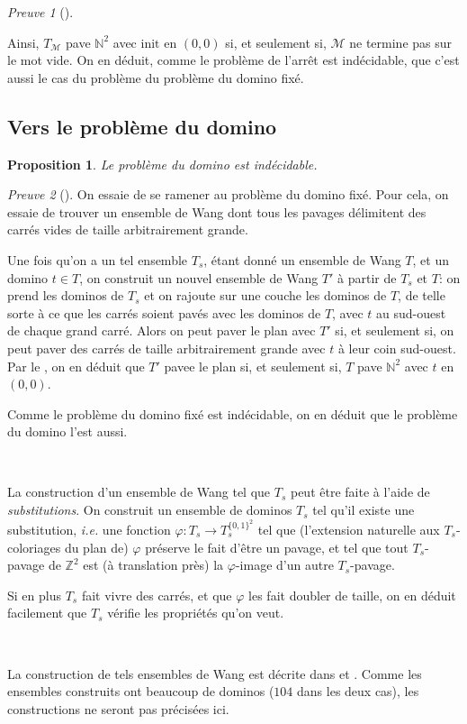 \documentclass{scrartcl}
\newcommand{\N}{\mathbb N}
\newcommand{\Z}{\mathbb Z}
\newtheorem{proposition}{Proposition}
\theoremstyle{definition}
\theoremstyle{remark}
\newtheorem*{preuve}{Preuve}
\begin{document}
\begin{preuve}[]
  \ 

  Ainsi, $T_\mathcal M$ pave $\N^2$ avec $\mathrm{init}$ en $(0,0)$ si, et seulement si, $\mathcal M$ ne termine pas sur le mot vide. On en déduit, comme le problème de l'arrêt est indécidable, que c'est aussi le cas du problème du problème du domino fixé.
\end{preuve}

\subsection{Vers le problème du domino}

\begin{proposition}
  Le problème du domino est indécidable.
\end{proposition}

\begin{preuve}[]
  On essaie de se ramener au problème du domino fixé. Pour cela, on essaie de trouver un ensemble de Wang dont tous les pavages délimitent des carrés vides de taille arbitrairement grande.
  
  Une fois qu'on a un tel ensemble $T_s$, étant donné un ensemble de Wang $T$, et un domino $t\in T$, on construit un nouvel ensemble de Wang $T'$ à partir de $T_s$ et $T$: on prend les dominos de $T_s$ et on rajoute sur une couche les dominos de $T$, de telle sorte à ce que les carrés soient pavés avec les dominos de $T$, avec $t$ au sud-ouest de chaque grand carré. Alors on peut paver le plan avec $T'$ si, et seulement si, on peut paver des carrés de taille arbitrairement grande avec $t$ à leur coin sud-ouest. Par le , on en déduit que $T'$ pavee le plan si, et seulement si, $T$ pave $\N^2$ avec $t$ en $(0,0)$.

  Comme le problème du domino fixé est indécidable, on en déduit que le problème du domino l'est aussi.

  \

  La construction d'un ensemble de Wang tel que $T_s$ peut être faite à l'aide de \emph{substitutions}. On construit un ensemble de dominos $T_s$ tel qu'il existe une substitution, \emph{i.e.} une fonction $\varphi:T_s\to T_s^{\{0,1\}^2}$ tel que (l'extension naturelle aux $T_s$-coloriages du plan de) $\varphi$ préserve le fait d'être un pavage, et tel que tout $T_s$-pavage de $\Z^2$ est (à translation près) la $\varphi$-image d'un autre $T_s$-pavage.
  
  Si en plus $T_s$ fait vivre des carrés, et que $\varphi$ les fait doubler de taille, on en déduit facilement que $T_s$ vérifie les propriétés qu'on veut.

  \

  La construction de tels ensembles de Wang est décrite dans \cite{shifts} et \cite{dom_prob}. Comme les ensembles construits ont beaucoup de dominos ($104$ dans les deux cas), les constructions ne seront pas précisées ici.
\end{preuve}
\end{document}
